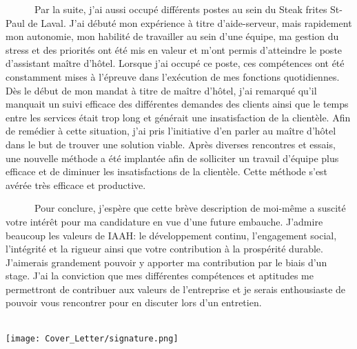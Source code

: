 \documentclass{article}
\begin{document}
\begin{textblock}{11.35}
	\ \ \ \ \ \ Par la suite, j’ai aussi occupé différents postes au sein  du Steak frites St-Paul de Laval. J’ai débuté mon expérience à titre d’aide-serveur, mais rapidement mon autonomie, mon habilité de travailler au sein d’une équipe, ma gestion du stress et des priorités ont été mis en valeur et m’ont permis d’atteindre le poste d’assistant maître d’hôtel. Lorsque j’ai occupé ce poste, ces compétences ont été constamment mises à l’épreuve dans l’exécution de mes fonctions quotidiennes.  Dès le début de mon mandat à titre de maître d’hôtel, j’ai remarqué qu’il manquait un suivi efficace des différentes demandes des clients ainsi que le temps entre les services était trop long et générait une insatisfaction de la clientèle. Afin de remédier à cette situation, j’ai pris l’initiative d’en parler au maître d’hôtel dans le but de trouver une solution viable. Après diverses rencontres et essais, une nouvelle méthode a été implantée afin de solliciter un travail d’équipe plus efficace et de diminuer les insatisfactions de la clientèle. Cette méthode s’est avérée très efficace et productive.

\bigskip
	

	\ \ \ \ \ \ Pour conclure, j'espère que cette brève description de moi-même a suscité votre intérêt pour ma candidature en vue d'une future embauche. J’admire beaucoup les valeurs de IAAH: le développement continu, l’engagement social, l’intégrité et la rigueur ainsi que votre contribution à la prospérité durable. J’aimerais grandement pouvoir y apporter ma contribution par le biais d’un stage. J'ai la conviction que mes différentes compétences et aptitudes me permettront de contribuer aux valeurs de l'entreprise et je serais enthousiaste de pouvoir vous rencontrer pour en discuter lors d'un entretien.
\bigskip

\textcolor{black}{} \\

\texttt{[image: Cover\_Letter/signature.png]}


\end{textblock}
\end{document}
